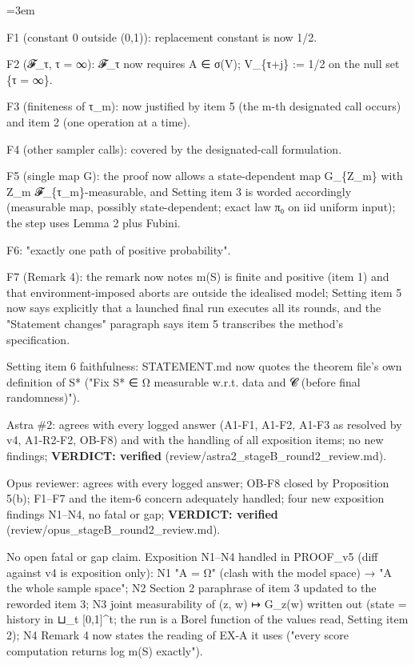 \documentclass[11pt]{report}
\newenvironment{mdblock}{\begingroup\mdfont\raggedright\setlength{\parindent}{0pt}\setlength{\parskip}{0.55em}\emergencystretch=3em}{\par\endgroup}
\newcommand{\mdhead}[2]{\par\vspace{0.7em}\noindent{\bfseries\ifcase#1\or\large\or\normalsize\or\normalsize\or\small\or\small\or\small\fi #2}\par\nopagebreak\vspace{0.1em}}
\begin{document}
\begin{mdblock}
\begin{mdbul}
\item F1 (constant 0 outside (0,1)): replacement constant is now 1/2.
\item F2 (𝓕\_τ, τ = ∞): 𝓕\_τ now requires A ∈ σ(V); V\_\{τ+j\} := 1/2 on the null set \{τ = ∞\}.
\item F3 (finiteness of τ\_m): now justified by item 5 (the m-th designated call occurs) and item 2 (one operation at a time).
\item F4 (other sampler calls): covered by the designated-call formulation.
\item F5 (single map G): the proof now allows a state-dependent map G\_\{Z\_m\} with Z\_m 𝓕\_\{τ\_m\}-measurable, and Setting item 3 is worded accordingly (measurable map, possibly state-dependent; exact law π₀ on iid uniform input); the step uses Lemma 2 plus Fubini.
\item F6: "exactly one path of positive probability".
\item F7 (Remark 4): the remark now notes m(S) is finite and positive (item 1) and that environment-imposed aborts are outside the idealised model; Setting item 5 now says explicitly that a launched final run executes all its rounds, and the "Statement changes" paragraph says item 5 transcribes the method's specification.
\item Setting item 6 faithfulness: STATEMENT.md now quotes the theorem file's own definition of S* ("Fix S* ∈ Ω measurable w.r.t. data and 𝓒 (before final randomness)").
\end{mdbul}

\mdhead{2}{Stage B, round 2 — rulings on PROOF\_v4}

\begin{mdbul}
\item Astra \#2: agrees with every logged answer (A1-F1, A1-F2, A1-F3 as resolved by v4, A1-R2-F2, OB-F8) and with the handling of all exposition items; no new findings; \textbf{VERDICT: verified} (review/astra2\_stageB\_round2\_review.md).
\item Opus reviewer: agrees with every logged answer; OB-F8 closed by Proposition 5(b); F1–F7 and the item-6 concern adequately handled; four new exposition findings N1–N4, no fatal or gap; \textbf{VERDICT: verified} (review/opus\_stageB\_round2\_review.md).
\item No open fatal or gap claim. Exposition N1–N4 handled in PROOF\_v5 (diff against v4 is exposition only): N1 "A = Ω" (clash with the model space) → "A the whole sample space"; N2 Section 2 paraphrase of item 3 updated to the reworded item 3; N3 joint measurability of (z, w) ↦ G\_z(w) written out (state = history in ⊔\_t [0,1]\textasciicircum{}t; the run is a Borel function of the values read, Setting item 2); N4 Remark 4 now states the reading of EX-A it uses ("every score computation returns log m(S) exactly").
\end{mdbul}


\end{mdblock}
\end{document}
